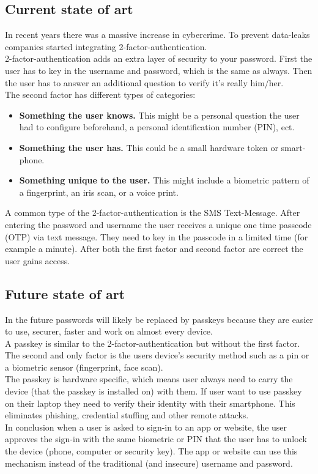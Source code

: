 \documentclass[conference]{IEEEtran}
\begin{document}
\subsection{Current state of art}
\cite{b4}In recent years there was a massive increase in cybercrime. To prevent data-leaks companies started integrating 2-factor-authentication.\\
2-factor-authentication adds an extra layer of security to your password. First the user has to key in the username and password, which is the same as always. Then the user has to answer an additional question to verify it's really him/her.\\
The second factor has different types of categories:
\begin{itemize}
\item \textbf{Something the user knows.}  This might be a personal question the user had to configure beforehand, a personal identification number (PIN), ect.
\item \textbf{Something the user has.} This could be a small hardware token or smart-phone.
\item \textbf{Something unique to the user.} This might include a  biometric pattern of a fingerprint, an iris scan, or a voice print. 
\end{itemize}
A common type of the 2-factor-authentication is the SMS Text-Message. After entering the password and username the user receives a unique one time passcode (OTP) via text message. They need to key in the passcode in a limited time (for example a minute). After both the first factor and second factor are correct the user gains access.
                                                                                               
\subsection{Future state of art}
\cite{b5} In the future passwords will likely be replaced by passkeys because they are easier to use, securer, faster and work on almost every device.\\
A passkey is similar to the 2-factor-authentication but without the first factor. The second and only factor is the users device's security method such as a pin or a biometric sensor (fingerprint, face scan). \\
The passkey is hardware specific, which means user always need to carry the device (that the passkey is installed on) with them. If user want to use passkey on their laptop they need to verify their identity with their smartphone. This eliminates phishing, credential stuffing and other remote attacks. \\
In conclusion when a user is asked to sign-in to an app or website, the user approves the sign-in with the same biometric or PIN that the user has to unlock the device 
(phone, computer or security key). The app or website can use this mechanism instead of the traditional (and insecure) username and password. 
\end{document}
